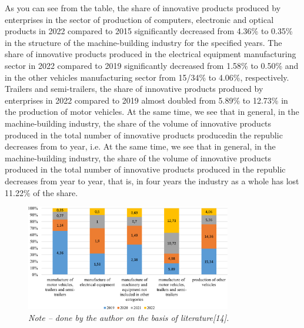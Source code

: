 \begin{multicols}{2}
As you can see from the table, the share of innovative products produced
by enterprises in the sector of production of computers, electronic and
optical products in 2022 compared to 2015 significantly decreased from
4.36\% to 0.35\% in the structure of the machine-building industry for
the specified years. The share of innovative products produced in the
electrical equipment manufacturing sector in 2022 compared to 2019
significantly decreased from 1.58\% to 0.50\% and in the other vehicles
manufacturing sector from 15/34\% to 4.06\%, respectively. Trailers and
semi-trailers, the share of innovative products produced by enterprises
in 2022 compared to 2019 almost doubled from 5.89\% to 12.73\% in the
production of motor vehicles. At the same time, we see that in general,
in the machine-building industry, the share of the volume of innovative
products produced in the total number of innovative products producedin
the republic decreases from to year, i.e. At the same time, we see that
in general, in the machine-building industry, the share of the volume of
innovative products produced in the total number of innovative products
produced in the republic decreases from year to year, that is, in four
years the industry as a whole has lost 11.22\% of the share.
\end{multicols}

\begin{figure}[H]
	\centering
	\includegraphics[width=0.8\textwidth]{media/ekon/Graph_7}
	\caption*{Figure 2 - Specific production rates of innovative products of enterprises of the machine-building industry of the Republic of Kazakhstan in 2019-2022, as a percentage}
	\caption*{\normalfont \emph{Note -- done by the author on the basis of literature{[}14{]}.}}
\end{figure}

